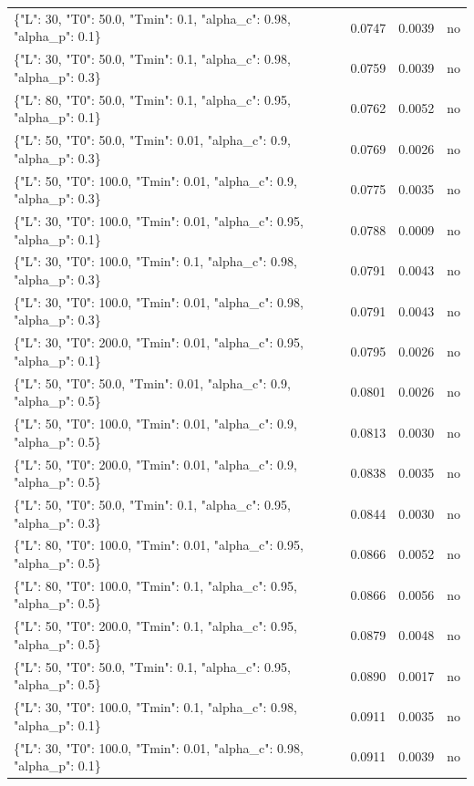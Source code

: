 \begin{table}[htbp]
\begin{tabular}{lrrr}
\{"L": 30, "T0": 50.0, "Tmin": 0.1, "alpha\_c": 0.98, "alpha\_p": 0.1\} & 0.0747 & 0.0039 & no \\
\{"L": 30, "T0": 50.0, "Tmin": 0.1, "alpha\_c": 0.98, "alpha\_p": 0.3\} & 0.0759 & 0.0039 & no \\
\{"L": 80, "T0": 50.0, "Tmin": 0.1, "alpha\_c": 0.95, "alpha\_p": 0.1\} & 0.0762 & 0.0052 & no \\
\{"L": 50, "T0": 50.0, "Tmin": 0.01, "alpha\_c": 0.9, "alpha\_p": 0.3\} & 0.0769 & 0.0026 & no \\
\{"L": 50, "T0": 100.0, "Tmin": 0.01, "alpha\_c": 0.9, "alpha\_p": 0.3\} & 0.0775 & 0.0035 & no \\
\{"L": 30, "T0": 100.0, "Tmin": 0.01, "alpha\_c": 0.95, "alpha\_p": 0.1\} & 0.0788 & 0.0009 & no \\
\{"L": 30, "T0": 100.0, "Tmin": 0.1, "alpha\_c": 0.98, "alpha\_p": 0.3\} & 0.0791 & 0.0043 & no \\
\{"L": 30, "T0": 100.0, "Tmin": 0.01, "alpha\_c": 0.98, "alpha\_p": 0.3\} & 0.0791 & 0.0043 & no \\
\{"L": 30, "T0": 200.0, "Tmin": 0.01, "alpha\_c": 0.95, "alpha\_p": 0.1\} & 0.0795 & 0.0026 & no \\
\{"L": 50, "T0": 50.0, "Tmin": 0.01, "alpha\_c": 0.9, "alpha\_p": 0.5\} & 0.0801 & 0.0026 & no \\
\{"L": 50, "T0": 100.0, "Tmin": 0.01, "alpha\_c": 0.9, "alpha\_p": 0.5\} & 0.0813 & 0.0030 & no \\
\{"L": 50, "T0": 200.0, "Tmin": 0.01, "alpha\_c": 0.9, "alpha\_p": 0.5\} & 0.0838 & 0.0035 & no \\
\{"L": 50, "T0": 50.0, "Tmin": 0.1, "alpha\_c": 0.95, "alpha\_p": 0.3\} & 0.0844 & 0.0030 & no \\
\{"L": 80, "T0": 100.0, "Tmin": 0.01, "alpha\_c": 0.95, "alpha\_p": 0.5\} & 0.0866 & 0.0052 & no \\
\{"L": 80, "T0": 100.0, "Tmin": 0.1, "alpha\_c": 0.95, "alpha\_p": 0.5\} & 0.0866 & 0.0056 & no \\
\{"L": 50, "T0": 200.0, "Tmin": 0.1, "alpha\_c": 0.95, "alpha\_p": 0.5\} & 0.0879 & 0.0048 & no \\
\{"L": 50, "T0": 50.0, "Tmin": 0.1, "alpha\_c": 0.95, "alpha\_p": 0.5\} & 0.0890 & 0.0017 & no \\
\{"L": 30, "T0": 100.0, "Tmin": 0.1, "alpha\_c": 0.98, "alpha\_p": 0.1\} & 0.0911 & 0.0035 & no \\
\{"L": 30, "T0": 100.0, "Tmin": 0.01, "alpha\_c": 0.98, "alpha\_p": 0.1\} & 0.0911 & 0.0039 & no \\

\end{tabular}
\end{table}
